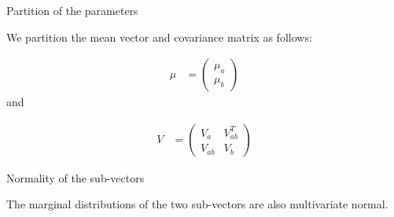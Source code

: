 Partition of the parameters

We partition the mean vector and covariance matrix as follows:

\begin{align*}
	\mu &= \begin{pmatrix}
		\mu_a \\
		\mu_b
	\end{pmatrix}
\end{align*}
and 

\begin{align*}
	V &= \begin{pmatrix}
		V_a & V_{ab}^T \\
		V_{ab} & V_b
	\end{pmatrix}
\end{align*}

Normality of the sub-vectors

The marginal distributions of the two sub-vectors are also multivariate normal.

